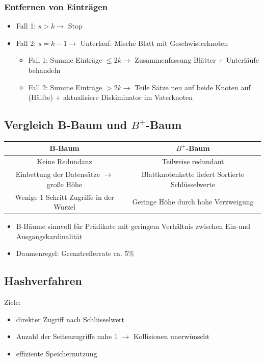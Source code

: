 \documentclass[a4paper]{article}
\begin{document}
    \subsubsection{Entfernen von Einträgen}
    \begin{itemize}
        \item Fall 1: $s > k \to$ Stop
        \item Fall 2: $s = k-1 \to$ Unterlauf: Mische Blatt mit Geschwisterknoten
        
        \begin{itemize}
            \item Fall 1: Summe Einträge $ \le 2k \to $ Zusammenfassung Blätter + Unterläufe behandeln
            \item Fall 2: Summe Einträge $ >  2k \to$ Teile Sätze neu auf beide Knoten auf (Hälfte) + aktualisiere Diskiminator im Vaterknoten
        \end{itemize}
    \end{itemize}

\subsection{Vergleich B-Baum und $B^+$-Baum}
\begin{tabular}{|c|c|}
    \hline
    \textbf{B-Baum}  & \textbf{$B^+$-Baum} \\
    \hline
    Keine Redundanz & Teilweise redundant \\
    \hline
    Einbettung der Datensätze $\to$ große Höhe & Blattknotenkette liefert Sortierte Schlüsselwerte \\
    \hline
    Wenige 1 Schritt Zugriffe in der Wurzel & Geringe Höhe durch hohe Verzweigung \\
    \hline
\end{tabular}
\begin{itemize}
    \item B-Bäume sinnvoll für Prädikate mit geringem Verhältnis zwischen Ein-und Ausgangskardinalität
    \item Daumenregel: Grenztrefferrate ca. 5\%
\end{itemize}

\subsection{Hashverfahren}
Ziele: 
\begin{itemize}
    \item direkter Zugriff nach Schlüsselwert
    \item Anzahl der Seitenzugriffe nahe 1 $\to$ Kollisionen unerwünscht
    \item effiziente Speichernutzung
\end{itemize}
\end{document}
